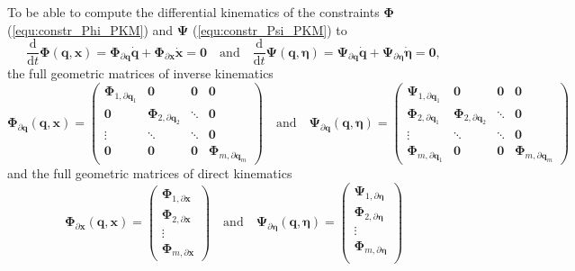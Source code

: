 \documentclass[robotics,article,submit,moreauthors,pdftex]{Definitions/mdpi}
\newcommand{\bm}[1]{\boldsymbol{#1}}
\begin{document}
To be able to compute the differential kinematics of the constraints $\bm{\Phi}$ (\ref{equ:constr_Phi_PKM}) and  $\bm{\Psi}$ (\ref{equ:constr_Psi_PKM}) to
%
\begin{equation}
\frac{\mathrm{d}}{{\mathrm{d}}t} \bm{\Phi}(\bm{q},\bm{x})
=
\bm{\Phi}_{\partial \bm{q}}  \dot{\bm{q}}
+
\bm{\Phi}_{\partial \bm{x}} \dot{\bm{x}}
=
\bm{0}
\quad
\mathrm{and}
\quad
\frac{\mathrm{d}}{{\mathrm{d}}t} \bm{\Psi}(\bm{q},\bm{\eta})
=
\bm{\Psi}_{\partial \bm{q}}  \dot{\bm{q}}
+
\bm{\Psi}_{\partial \bm{\eta}} \dot{\bm{\eta}}
=
\bm{0},
\label{equ:constr_diff}
\end{equation}
%
the full geometric matrices of inverse kinematics
%
\begin{equation}
\bm{\Phi}_{\partial \bm{q}}(\bm{q},\bm{x})
=
\begin{pmatrix}
\bm{\Phi}_{1,\partial\bm{q}_1}  & \bm{0} & \bm{0} & \bm{0}\\
\bm{0} & \bm{\Phi}_{2,\partial\bm{q}_2} & \ddots & \bm{0}  \\
\vdots & \ddots & \ddots & \bm{0}  \\
\bm{0} & \bm{0} & \bm{0} &\bm{\Phi}_{m,\partial\bm{q}_m}
\end{pmatrix}
\quad
\mathrm{and}
\quad
\bm{\Psi}_{\partial \bm{q}}(\bm{q},\bm{\eta})
=
\begin{pmatrix}
\bm{\Psi}_{1,\partial\bm{q}_1}  & \bm{0} & \bm{0} & \bm{0}\\
\bm{\Phi}_{2,\partial\bm{q}_1} & \bm{\Phi}_{2,\partial\bm{q}_2} & \ddots & \bm{0}  \\
\vdots & \ddots & \ddots & \bm{0}  \\
\bm{\Phi}_{m,\partial\bm{q}_1} & \bm{0} & \bm{0} &\bm{\Phi}_{m,\partial\bm{q}_m}
\end{pmatrix}
\label{equ:PhiPsi_grad_q_complete}
\end{equation}
%
and the full geometric matrices of direct kinematics
%
\begin{equation}
\bm{\Phi}_{\partial \bm{x}}(\bm{q},\bm{x})
=
\begin{pmatrix}
\bm{\Phi}_{1,\partial\bm{x}} \\
\bm{\Phi}_{2,\partial\bm{x}} \\
\vdots \\
\bm{\Phi}_{m,\partial\bm{x}}
\end{pmatrix}
\quad
\mathrm{and}
\quad
\bm{\Psi}_{\partial \bm{\eta}}(\bm{q},\bm{\eta})
=
\begin{pmatrix}
\bm{\Psi}_{1,\partial\bm{\eta}} \\
\bm{\Phi}_{2,\partial\bm{\eta}} \\
\vdots \\
\bm{\Phi}_{m,\partial\bm{\eta}} \\
\end{pmatrix}
\label{equ:PhiPsi_grad_x_complete}
\end{equation}
\end{document}
